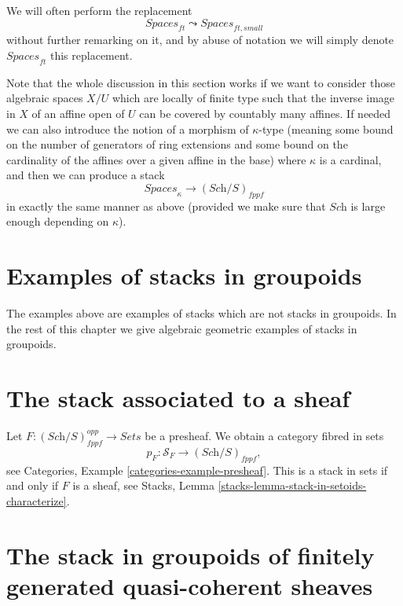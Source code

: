 \noindent
We will often perform the replacement
$$
\textit{Spaces}_{ft} \leadsto \textit{Spaces}_{ft, small}
$$
without further remarking on it, and by abuse of notation we will
simply denote $\textit{Spaces}_{ft}$ this replacement.

\begin{remark}
\label{remark-higher-cardinality-spaces}
Note that the whole discussion in this section works
if we want to consider those algebraic spaces $X/U$ which are
locally of finite type such that the inverse image in $X$ of an affine open
of $U$ can be covered by countably many affines.
If needed we can also introduce the notion of a morphism of
$\kappa$-type (meaning some bound on the number of generators of
ring extensions and some bound on the cardinality of the affines over
a given affine in the base) where $\kappa$ is a cardinal, and then
we can produce a stack
$$
\textit{Spaces}_\kappa \longrightarrow (\textit{Sch}/S)_{fppf}
$$
in exactly the same manner as above (provided we make sure that
$\textit{Sch}$ is large enough depending on $\kappa$).
\end{remark}





\section{Examples of stacks in groupoids}
\label{section-examples-stacks-in-groupoids}

\noindent
The examples above are examples of stacks which are not stacks in
groupoids. In the rest of this chapter we give
algebraic geometric examples of stacks in groupoids.



\section{The stack associated to a sheaf}
\label{section-stack-associated-to-sheaf}

\noindent
Let $F : (\textit{Sch}/S)_{fppf}^{opp} \to \textit{Sets}$ be a presheaf.
We obtain a category fibred in sets
$$
p_F : \mathcal{S}_F \to (\textit{Sch}/S)_{fppf},
$$
see
Categories, Example \ref{categories-example-presheaf}.
This is a stack in sets if and only if $F$ is a sheaf, see
Stacks, Lemma \ref{stacks-lemma-stack-in-setoids-characterize}.



\section{The stack in groupoids of finitely generated quasi-coherent sheaves}
\label{section-stack-in-groupoids-of-quasi-coherent-sheaves}

